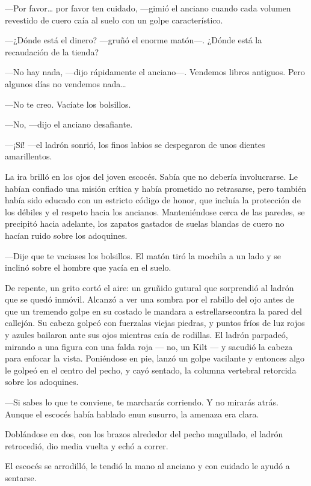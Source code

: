 ---Por favor\ldots{} por favor ten cuidado, ---gimió el anciano
cuando cada volumen revestido de cuero caía al suelo con un golpe
característico.

---¿Dónde está el dinero? ---gruñó el enorme matón---. ¿Dónde
está la recaudación de la tienda?

---No hay nada, ---dijo rápidamente el anciano---. Vendemos
libros antiguos. Pero algunos días no vendemos nada\ldots{}

---No te creo. Vacíate los bolsillos.

---No, ---dijo el anciano desafiante.

---¡Sí! ---el ladrón sonrió, los finos labios se despegaron de
unos dientes amarillentos.

La ira brilló en los ojos del joven escocés. Sabía que no
debería involucrarse. Le habían confiado una misión crítica y había
prometido no retrasarse, pero también había sido educado con un estricto
código de honor, que incluía la protección de los débiles y el respeto
hacia los ancianos. Manteniéndose cerca de las paredes, se precipitó
hacia adelante, los zapatos gastados de suelas blandas de cuero no
hacían ruido sobre los adoquines.

---Dije que te vaciases los bolsillos. El matón tiró la mochila
a un lado y se inclinó sobre el hombre que yacía en el suelo.

De repente, un grito cortó el aire: un gruñido gutural que
sorprendió al ladrón que se quedó inmóvil. Alcanzó a ver una sombra por
el rabillo del ojo antes de que un tremendo golpe en su costado le
mandara a estrellarsecontra la pared del callejón. Su cabeza golpeó con
fuerzalas viejas piedras, y puntos fríos de luz rojos y azules bailaron
ante sus ojos mientras caía de rodillas. El ladrón parpadeó, mirando a
una figura con una falda roja --- no, un Kilt --- y sacudió la cabeza
para enfocar la vista. Poniéndose en pie, lanzó un golpe vacilante y
entonces algo le golpeó en el centro del pecho, y cayó sentado, la
columna vertebral retorcida sobre los adoquines.

---Si sabes lo que te conviene, te marcharás corriendo. Y no
mirarás atrás. Aunque el escocés había hablado enun susurro, la amenaza
era clara.

Doblándose en dos, con los brazos alrededor del pecho magullado,
el ladrón retrocedió, dio media vuelta y echó a correr.

El escocés se arrodilló, le tendió la mano al anciano y con
cuidado le ayudó a sentarse.

